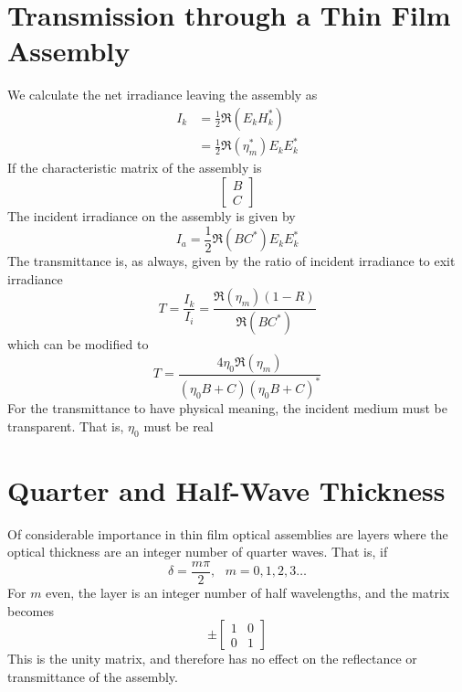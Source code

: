 \documentclass{article}
\begin{document}
\section{Transmission through a Thin Film Assembly}
    We calculate the net irradiance leaving the assembly as
    \begin{align}
        I_k &= \frac{1}{2}\Re\left(E_k H_k^*\right) \\
            &= \frac{1}{2}\Re\left(\eta_m^*\right) E_k E_k^*
    \end{align}
    If the characteristic matrix of the assembly is
    \begin{equation*}
        \begin{bmatrix}
            B \\
            C
        \end{bmatrix}        
    \end{equation*}
    The incident irradiance on the assembly is given by
    \begin{equation}
        I_a = \frac{1}{2}\Re\left(BC^*\right)E_k E_k^*        
    \end{equation}
    The transmittance is, as always, given by the ratio of incident irradiance to exit irradiance
    \begin{equation}
        T = \frac{I_k}{I_i} = \frac{\Re\left(\eta_m\right)(1-R)}{\Re\left(B C^*\right)}        
    \end{equation}
    which can be modified to
    \begin{equation}
        T = \frac{4 \eta_0 \Re(\eta_m)}{(\eta_0 B + C)(\eta_0 B + C)^*} 
    \end{equation}
    For the transmittance to have physical meaning, the incident medium must be transparent. That is, $\eta_0$ must be real

\section{Quarter and Half-Wave Thickness}
    Of considerable importance in thin film optical assemblies are layers where the optical thickness are an integer number of quarter waves. That is, if
    \begin{equation*}  
        \delta = \frac{m \pi}{2}, \text{	} m = 0, 1, 2, 3 \ldots
    \end{equation*}
    For $m$ even, the layer is an integer number of half wavelengths, and the matrix becomes
    \begin{equation*}
        \pm
        \begin{bmatrix}
            1 & 0 \\
            0 & 1                        
        \end{bmatrix}
    \end{equation*}
    This is the unity matrix, and therefore has no effect on the reflectance or transmittance of the assembly.
\end{document}
